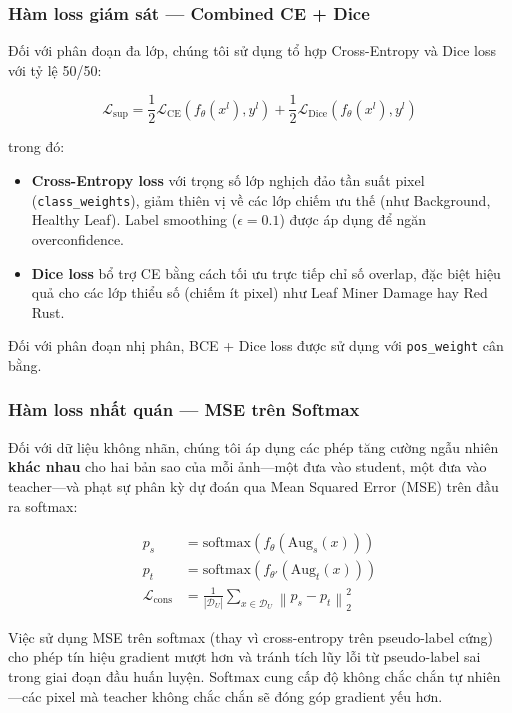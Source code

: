 \documentclass[conference]{IEEEtran}
\begin{document}
\subsubsection{Hàm loss giám sát --- Combined CE + Dice}

Đối với phân đoạn đa lớp, chúng tôi sử dụng tổ hợp Cross-Entropy và Dice loss với tỷ lệ 50/50:

\begin{equation}
\mathcal{L}_{\text{sup}} = \frac{1}{2}\mathcal{L}_{\text{CE}}(f_\theta(x^l), y^l) + \frac{1}{2}\mathcal{L}_{\text{Dice}}(f_\theta(x^l), y^l)
\end{equation}

trong đó:
\begin{itemize}
    \item \textbf{Cross-Entropy loss} với trọng số lớp nghịch đảo tần suất pixel (\texttt{class\_weights}), giảm thiên vị về các lớp chiếm ưu thế (như Background, Healthy Leaf). Label smoothing ($\epsilon=0.1$) được áp dụng để ngăn overconfidence.
    \item \textbf{Dice loss} bổ trợ CE bằng cách tối ưu trực tiếp chỉ số overlap, đặc biệt hiệu quả cho các lớp thiểu số (chiếm ít pixel) như Leaf Miner Damage hay Red Rust.
\end{itemize}

Đối với phân đoạn nhị phân, BCE + Dice loss được sử dụng với \texttt{pos\_weight} cân bằng.

\subsubsection{Hàm loss nhất quán --- MSE trên Softmax}

Đối với dữ liệu không nhãn, chúng tôi áp dụng các phép tăng cường ngẫu nhiên \textbf{khác nhau} cho hai bản sao của mỗi ảnh---một đưa vào student, một đưa vào teacher---và phạt sự phân kỳ dự đoán qua Mean Squared Error (MSE) trên đầu ra softmax:

\begin{align}
    p_s &= \text{softmax}(f_\theta(\text{Aug}_s(x))) \\
    p_t &= \text{softmax}(f_{\theta'}(\text{Aug}_t(x))) \\
    \mathcal{L}_{\text{cons}} &= \frac{1}{|\mathcal{D}_U|}\sum_{x \in \mathcal{D}_U} \left\| p_s - p_t \right\|_2^2
\end{align}

Việc sử dụng MSE trên softmax (thay vì cross-entropy trên pseudo-label cứng) cho phép tín hiệu gradient mượt hơn và tránh tích lũy lỗi từ pseudo-label sai trong giai đoạn đầu huấn luyện. Softmax cung cấp độ không chắc chắn tự nhiên---các pixel mà teacher không chắc chắn sẽ đóng góp gradient yếu hơn.
\end{document}
